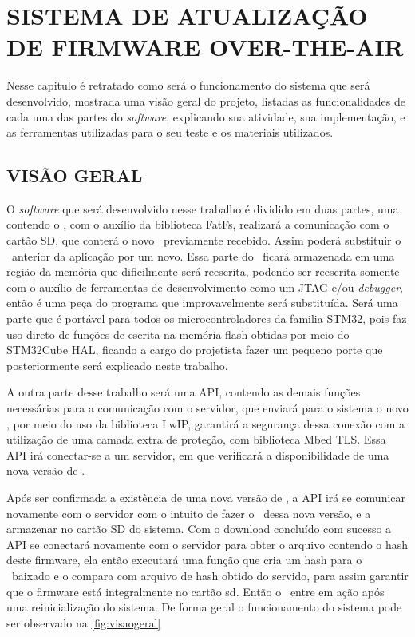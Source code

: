 
\chapter{SISTEMA DE ATUALIZAÇÃO DE FIRMWARE OVER-THE-AIR}
\label{chap:metodologia}
Nesse capitulo é retratado como será o funcionamento do sistema que será desenvolvido, mostrada uma visão geral do projeto, listadas as funcionalidades de cada uma das partes do \textit{software}, explicando sua atividade, sua implementação, e as ferramentas utilizadas para o seu teste e os materiais utilizados. 

\section{VISÃO GERAL}
O \textit{software} que será desenvolvido nesse trabalho é dividido em duas partes, uma contendo o \bootloader, com o auxílio da biblioteca FatFs, realizará a comunicação com o cartão SD, que conterá o novo \firmware\ previamente recebido. Assim poderá substituir o \software\ anterior da aplicação por um novo. Essa parte do \software\ ficará armazenada em uma região da memória que dificilmente será reescrita, podendo ser reescrita somente com o auxílio de ferramentas de desenvolvimento como um JTAG e/ou \textit{debugger}, então é uma peça do programa que improvavelmente será substituída. Será uma parte que é portável para todos os microcontroladores da familia STM32, pois faz uso direto de funções de escrita na memória flash obtidas por meio do STM32Cube HAL, ficando a cargo do projetista fazer um pequeno porte que posteriormente será explicado neste trabalho.

A outra parte desse trabalho será uma API, contendo as demais funções necessárias para a comunicação com o servidor, que enviará para o sistema o novo \firmware, por meio do uso da biblioteca LwIP, garantirá a segurança dessa conexão com a utilização de uma camada extra de proteção, com biblioteca Mbed TLS. Essa API irá conectar-se a um servidor, em que verificará a disponibilidade de uma nova versão de \software. 

Após ser confirmada a existência de uma nova versão de \firmware, a API irá se comunicar novamente com o servidor com o intuito de fazer o \download\ dessa nova versão, e a armazenar no cartão SD do sistema. Com o download concluído com sucesso a API se conectará novamente com o servidor para obter o arquivo contendo o hash deste firmware, ela então executará uma função que cria um hash para o \firmware\ baixado e o compara com arquivo de hash obtido do servido, para assim garantir que o firmware está integralmente no cartão sd. Então o \bootloader\ entre em ação após uma reinicialização do sistema. De forma geral o funcionamento do sistema pode ser observado na \autoref{fig:visaogeral}

